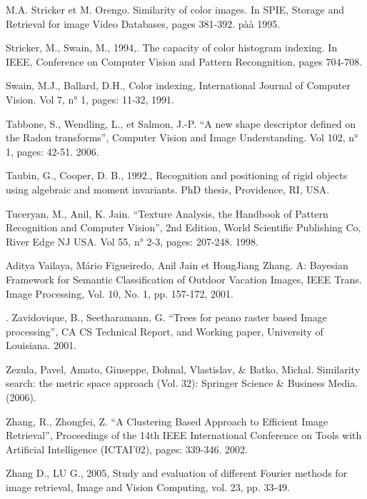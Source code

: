 \documentclass[
openany,
11pt, %
french, %
singlespacing, %
headsepline, %
]{MastersDoctoralThesis} %
\begin{document}
\begin{thebibliography}{widest entry}
	  M.A. Stricker et M. Orengo. Similarity of color images. In SPIE, Storage
	and Retrieval for image Video Databases, pages 381-392. pàà 1995.
	
	
	  Stricker, M.,  Swain, M., 1994,. The capacity of color histogram indexing. In IEEE, Conference on Computer Vision and Pattern Recongnition, pages 704-708.
	
	  Swain, M.J., Ballard, D.H., Color indexing, International Journal of Computer
	Vision. Vol 7, n° 1, pages: 11-32, 1991.
	
	 Tabbone, S., Wendling, L., et Salmon, J.-P. “A new shape descriptor defined on the Radon transforms”, Computer Vision and Image Understanding. Vol 102, n° 1, pages: 42-51. 2006.
	
	 Taubin, G.,  Cooper, D. B., 1992., Recognition and positioning of rigid objects using algebraic and moment invariants. PhD thesis, Providence, RI, USA.
	
	
	  Tuceryan, M., Anil, K. Jain. “Texture Analysis, the Handbook of Pattern Recognition and Computer Vision”, 2nd Edition, World Scientific Publishing Co, River Edge NJ
	USA. Vol 55, n° 2-3, pages: 207-248. 1998.
	
	
	 Aditya Vailaya, Mário Figueiredo, Anil Jain et HongJiang Zhang. A: Bayesian Framework for Semantic Classification of Outdoor Vacation Images, IEEE Trans. Image Processing, Vol. 10, No. 1, pp. 157-172, 2001.
	
	
	. Zavidovique, B., Seetharamann, G. “Trees for peano raster based Image processing”, CA CS Technical Report, and Working paper, University of Louisiana. 2001.
	
	
	
	  Zezula, Pavel, Amato, Giuseppe, Dohnal, Vlastislav, \& Batko, Michal. Similarity search: the metric space approach (Vol. 32): Springer Science \& Business Media. (2006).
	
	 Zhang, R., Zhongfei, Z. “A Clustering Based Approach to Efficient Image Retrieval”, Proceedings of the 14th IEEE International Conference on Tools with Artificial Intelligence (ICTAI’02), pages: 339-346. 2002.
	
	 Zhang D., LU G., 2005, Study and evaluation of different Fourier methods for image retrieval, Image and Vision Computing, vol. 23, pp. 33-49.
	

\end{thebibliography}
\end{document}
